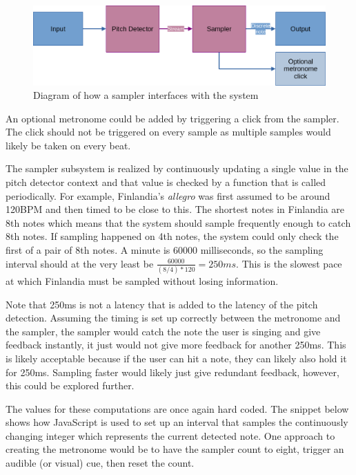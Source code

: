 \begin{figure}[ht]
    \centering
    \includegraphics[width=\textwidth]{./images/samplerArch.png}
    \caption{Diagram of how a sampler interfaces with the system\label{fig:samplerArch}}
\end{figure}

An optional metronome could be added by triggering a click from the sampler. The click should not be triggered on every sample as multiple samples would likely be taken on every beat. 

The sampler subsystem is realized by continuously updating a single value in the pitch detector context and that value is checked by a function that is called periodically. For example, Finlandia's \textit{allegro} was first assumed to be around 120BPM and then timed to be close to this. The shortest notes in Finlandia are 8th notes which means that the system should sample frequently enough to catch 8th notes. If sampling happened on 4th notes, the system could only check the first of a pair of 8th notes. A minute is 60000 milliseconds, so the sampling interval should at the very least be $\frac{60000}{(8/4)*120} = 250ms$. This is the slowest pace at which Finlandia must be sampled without losing information.

Note that 250ms is not a latency that is added to the latency of the pitch detection. Assuming the timing is set up correctly between the metronome and the sampler, the sampler would catch the note the user is singing and give feedback instantly, it just would not give more feedback for another 250ms. This is likely acceptable because if the user can hit a note, they can likely also hold it for 250ms. Sampling faster would likely just give redundant feedback, however, this could be explored further. 

The values for these computations are once again hard coded. The snippet below shows how JavaScript is used to set up an interval that samples the continuously changing integer which represents the current detected note.  One approach to creating the metronome would be to have the sampler count to eight, trigger an audible (or visual) cue, then reset the count.



